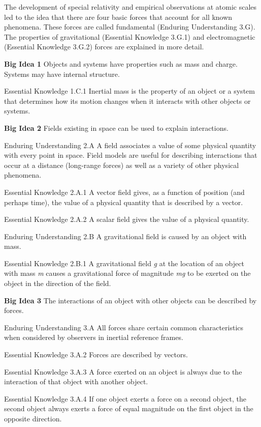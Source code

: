 \documentclass[
]{book}
\begin{document}
The development of special relativity and empirical observations at
atomic scales led to the idea that there are four basic forces that
account for all known phenomena. These forces are called fundamental
(Enduring Understanding 3.G). The properties of gravitational (Essential
Knowledge 3.G.1) and electromagnetic (Essential Knowledge 3.G.2) forces
are explained in more detail.

\textbf{Big Idea 1} Objects and systems have properties such as mass and
charge. Systems may have internal structure.

Essential Knowledge 1.C.1 Inertial mass is the property of an object or
a system that determines how its motion changes when it interacts with
other objects or systems.

\textbf{Big Idea 2} Fields existing in space can be used to explain
interactions.

Enduring Understanding 2.A A field associates a value of some physical
quantity with every point in space. Field models are useful for
describing interactions that occur at a distance (long-range forces) as
well as a variety of other physical phenomena.

Essential Knowledge 2.A.1 A vector field gives, as a function of
position (and perhaps time), the value of a physical quantity that is
described by a vector.

Essential Knowledge 2.A.2 A scalar field gives the value of a physical
quantity.

Enduring Understanding 2.B A gravitational field is caused by an object
with mass.

Essential Knowledge 2.B.1 A gravitational field \emph{g} at the location of
an object with mass \emph{m} causes a gravitational force of magnitude \emph{mg}
to be exerted on the object in the direction of the field.

\textbf{Big Idea 3} The interactions of an object with other objects can be
described by forces.

Enduring Understanding 3.A All forces share certain common
characteristics when considered by observers in inertial reference
frames.

Essential Knowledge 3.A.2 Forces are described by vectors.

Essential Knowledge 3.A.3 A force exerted on an object is always due to
the interaction of that object with another object.

Essential Knowledge 3.A.4 If one object exerts a force on a second
object, the second object always exerts a force of equal magnitude on
the first object in the opposite direction.
\end{document}
